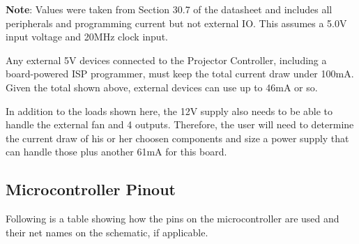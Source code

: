 \documentclass{article}
\begin{document}
{\small \textbf{Note}: Values were taken from Section 30.7 of the datasheet and includes all peripherals and
programming current but not external IO.  This assumes a 5.0V input voltage and 20MHz clock input.}

Any external 5V devices connected to the Projector Controller, including a board-powered ISP
programmer, must keep the total current draw under 100mA.  Given the total shown above, external
devices can use up to 46mA or so.

In addition to the loads shown here, the 12V supply also needs to be able to handle the external fan
and 4 outputs.  Therefore, the user will need to determine the current draw of his or her choosen
components and size a power supply that can handle those plus another 61mA for this board.

\subsection{Microcontroller Pinout} \label{ssec:MicroPinout}
Following is a table showing how the pins on the microcontroller are used and their net names on the
schematic, if applicable.
\end{document}
